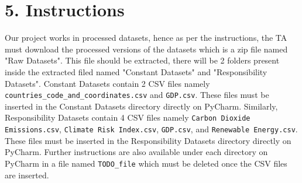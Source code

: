 \documentclass[fontsize=11pt]{article}
\begin{document}
    \section*{5. Instructions}
    Our project works in processed datasets, hence as per the instructions, the TA must download the processed versions
    of the datasets which is a zip file named "Raw Datasets". This file should be extracted, there will be 2 folders present
    inside the extracted filed named "Constant Datasets" and "Responsibility Datasets". Constant Datasets contain 2 CSV files
    namely \texttt{countries\_code\_and\_coordinates.csv} and \texttt{GDP.csv}. These files must be inserted in the Constant Datasets
    directory directly on PyCharm. Similarly, Responsibility Datasets contain 4 CSV files namely \texttt{Carbon Dioxide Emissions.csv},
    \texttt{Climate Risk Index.csv}, \texttt{GDP.csv}, and \texttt{Renewable Energy.csv}. These files must be inserted in the Responsibility Datasets
    directory directly on PyCharm. Further instructions are also available under each directory on PyCharm in a file named \texttt{TODO\_file} which
    must be deleted once the CSV files are inserted.\newline
\end{document}
